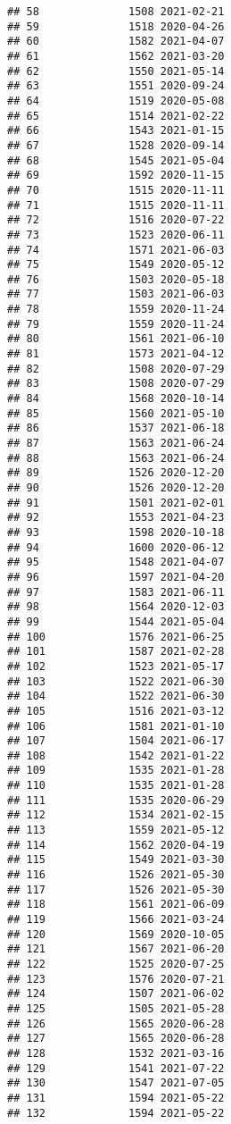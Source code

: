 \documentclass[
]{article}
\begin{document}
\begin{verbatim}
## 58              1508 2021-02-21
## 59              1518 2020-04-26
## 60              1582 2021-04-07
## 61              1562 2021-03-20
## 62              1550 2021-05-14
## 63              1551 2020-09-24
## 64              1519 2020-05-08
## 65              1514 2021-02-22
## 66              1543 2021-01-15
## 67              1528 2020-09-14
## 68              1545 2021-05-04
## 69              1592 2020-11-15
## 70              1515 2020-11-11
## 71              1515 2020-11-11
## 72              1516 2020-07-22
## 73              1523 2020-06-11
## 74              1571 2021-06-03
## 75              1549 2020-05-12
## 76              1503 2020-05-18
## 77              1503 2021-06-03
## 78              1559 2020-11-24
## 79              1559 2020-11-24
## 80              1561 2021-06-10
## 81              1573 2021-04-12
## 82              1508 2020-07-29
## 83              1508 2020-07-29
## 84              1568 2020-10-14
## 85              1560 2021-05-10
## 86              1537 2021-06-18
## 87              1563 2021-06-24
## 88              1563 2021-06-24
## 89              1526 2020-12-20
## 90              1526 2020-12-20
## 91              1501 2021-02-01
## 92              1553 2021-04-23
## 93              1598 2020-10-18
## 94              1600 2020-06-12
## 95              1548 2021-04-07
## 96              1597 2021-04-20
## 97              1583 2021-06-11
## 98              1564 2020-12-03
## 99              1544 2021-05-04
## 100             1576 2021-06-25
## 101             1587 2021-02-28
## 102             1523 2021-05-17
## 103             1522 2021-06-30
## 104             1522 2021-06-30
## 105             1516 2021-03-12
## 106             1581 2021-01-10
## 107             1504 2021-06-17
## 108             1542 2021-01-22
## 109             1535 2021-01-28
## 110             1535 2021-01-28
## 111             1535 2020-06-29
## 112             1534 2021-02-15
## 113             1559 2021-05-12
## 114             1562 2020-04-19
## 115             1549 2021-03-30
## 116             1526 2021-05-30
## 117             1526 2021-05-30
## 118             1561 2021-06-09
## 119             1566 2021-03-24
## 120             1569 2020-10-05
## 121             1567 2021-06-20
## 122             1525 2020-07-25
## 123             1576 2020-07-21
## 124             1507 2021-06-02
## 125             1505 2021-05-28
## 126             1565 2020-06-28
## 127             1565 2020-06-28
## 128             1532 2021-03-16
## 129             1541 2021-07-22
## 130             1547 2021-07-05
## 131             1594 2021-05-22
## 132             1594 2021-05-22

\end{verbatim}
\end{document}
